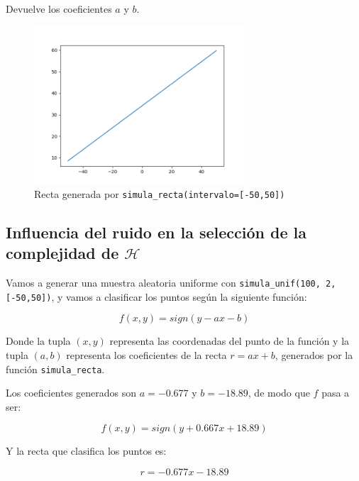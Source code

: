 \documentclass{article}
\begin{document}
\begin{enumerate}
        Devuelve los coeficientes $a$ y $b$.
        \begin{figure}[h]
            \centering
            \caption{Recta generada por \texttt{simula\_recta(intervalo=[-50,50])}}
            \includegraphics[width=0.7\textwidth]{recta.png}
        \end{figure}
    \end{enumerate}
    \pagebreak

    \subsection{Influencia del ruido en la selección de la complejidad de $\mathcal{H}$}

    Vamos a generar una muestra aleatoria uniforme con \texttt{simula\_unif(100, 2, [-50,50])}, y vamos a
    clasificar los puntos según la siguiente función:

    \begin{equation*}
        f(x, y) = sign(y - ax - b)
    \end{equation*}

    Donde la tupla $(x,y)$ representa las coordenadas del punto de la función y la tupla $(a,b)$
    representa los coeficientes de la recta $r = ax + b$, generados por la función \texttt{simula\_recta}.
    
    Los coeficientes generados son $a = -0.677$ y $b = -18.89$, de modo que $f$ pasa a ser:

    \begin{equation*}
        f(x, y) = sign(y + 0.667x + 18.89)
    \end{equation*}

    Y la recta que clasifica los puntos es:

    \begin{equation*}
        r = -0.677x - 18.89
    \end{equation*}
\end{document}
